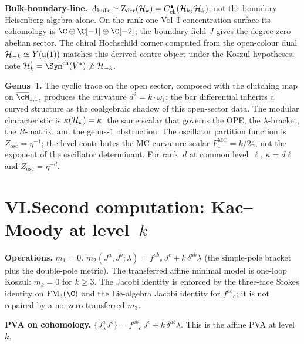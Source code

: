 \smallskip
\noindent\textbf{Bulk-boundary-line.}\enspace
$A_{\mathrm{bulk}} \simeq \operatorname{Z}_{\mathrm{der}}(\mathcal{H}_k)=C^\bullet_{\mathrm{ch}}(\mathcal{H}_k,\mathcal{H}_k)$,
not the boundary Heisenberg algebra alone.  On the rank-one Vol~I
concentration surface its cohomology is
$\C\oplus\C[-1]\oplus\C[-2]$; the boundary field $J$ gives the
degree-zero abelian sector.  The chiral Hochschild corner computed
from the open-colour dual
$\mathcal{H}_{-k} \simeq Y(\mathfrak{u}(1))$ matches this derived-centre
object under the Koszul hypotheses; note
$\cH_k^! = \Sym^{\mathrm{ch}}(V^*) \not\simeq \cH_{-k}$.

\smallskip
\noindent\textbf{Genus~$1$.}\enspace
The cyclic trace on the open sector, composed with the
clutching map on $\overline{\cM}_{1,1}$, produces the
curvature $d^2 = k \cdot \omega_1$: the bar differential
inherits a curved structure as the coalgebraic shadow of
this open-sector data. The modular characteristic is
$\kappa(\mathcal{H}_k) = k$: the same scalar that governs the OPE, the
$\lambda$-bracket, the $R$-matrix, and the genus-$1$ obstruction.
The oscillator partition function is $Z_{\mathrm{osc}}=\eta^{-1}$;
the level contributes the MC curvature scalar
$F_1^{\mathrm{MC}}=k/24$, not the exponent of the oscillator
determinant.  For rank~$d$ at common level~$\ell$,
$\kappa=d\ell$ and $Z_{\mathrm{osc}}=\eta^{-d}$.


\section*{VI.\quad Second computation: Kac--Moody at level~$k$}

\noindent\textbf{Operations.}\enspace
$m_1 = 0$.
$m_2(J^a, J^b;\lambda) = f^{ab}{}_c\,J^c + k\,\delta^{ab}\lambda$
(the simple-pole bracket plus the double-pole metric).
The transferred affine minimal model is one-loop Koszul:
$m_k=0$ for $k\ge3$.  The Jacobi identity is enforced by the
three-face Stokes identity on $\FM_3(\C)$ and the Lie-algebra Jacobi
identity for $f^{ab}{}_c$; it is not repaired by a nonzero transferred
$m_3$.

\smallskip
\noindent\textbf{PVA on cohomology.}\enspace
$\{J^a_\lambda J^b\} = f^{ab}{}_c\,J^c + k\,\delta^{ab}\lambda$.
This is the affine PVA at level~$k$.

